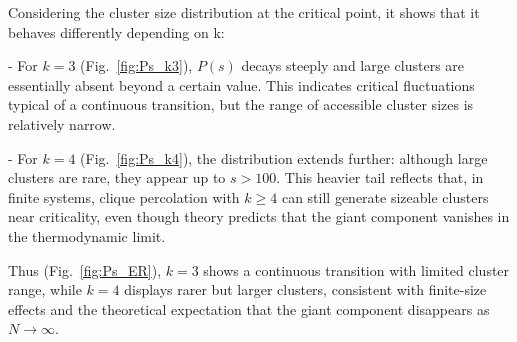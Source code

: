 Considering the cluster size distribution at the critical point, it shows that it behaves differently depending on k:

- For $k=3$ (Fig.~\ref{fig:Ps_k3}), $P(s)$ decays steeply and large clusters 
  are essentially absent beyond a certain value. 
  This indicates critical fluctuations typical of a continuous transition, 
  but the range of accessible cluster sizes is relatively narrow.  

- For $k=4$ (Fig.~\ref{fig:Ps_k4}), the distribution extends further: 
  although large clusters are rare, they appear up to $s > 100$. 
  This heavier tail reflects that, in finite systems, clique percolation 
  with $k \geq 4$ can still generate sizeable clusters near criticality, 
  even though theory predicts that the giant component vanishes in the 
  thermodynamic limit.  

Thus (Fig.~\ref{fig:Ps_ER}), $k=3$ shows a continuous transition with limited 
cluster range, while $k=4$ displays rarer but larger clusters, consistent 
with finite-size effects and the theoretical expectation that the giant 
component disappears as $N \to \infty$.

